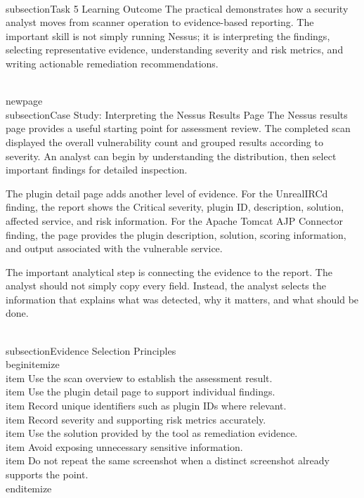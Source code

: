 \documentclass[11pt,a4paper]{article}
\begin{document}
\\subsection{Task 5 Learning Outcome}
The practical demonstrates how a security analyst moves from scanner operation to evidence-based reporting. The important skill is not simply running Nessus; it is interpreting the findings, selecting representative evidence, understanding severity and risk metrics, and writing actionable remediation recommendations.

\\newpage
\\subsection{Case Study: Interpreting the Nessus Results Page}
The Nessus results page provides a useful starting point for assessment review. The completed scan displayed the overall vulnerability count and grouped results according to severity. An analyst can begin by understanding the distribution, then select important findings for detailed inspection.

The plugin detail page adds another level of evidence. For the UnrealIRCd finding, the report shows the Critical severity, plugin ID, description, solution, affected service, and risk information. For the Apache Tomcat AJP Connector finding, the page provides the plugin description, solution, scoring information, and output associated with the vulnerable service.

The important analytical step is connecting the evidence to the report. The analyst should not simply copy every field. Instead, the analyst selects the information that explains what was detected, why it matters, and what should be done.

\\subsection{Evidence Selection Principles}
\\begin{itemize}
\\item Use the scan overview to establish the assessment result.
\\item Use the plugin detail page to support individual findings.
\\item Record unique identifiers such as plugin IDs where relevant.
\\item Record severity and supporting risk metrics accurately.
\\item Use the solution provided by the tool as remediation evidence.
\\item Avoid exposing unnecessary sensitive information.
\\item Do not repeat the same screenshot when a distinct screenshot already supports the point.
\\end{itemize}
\end{document}
